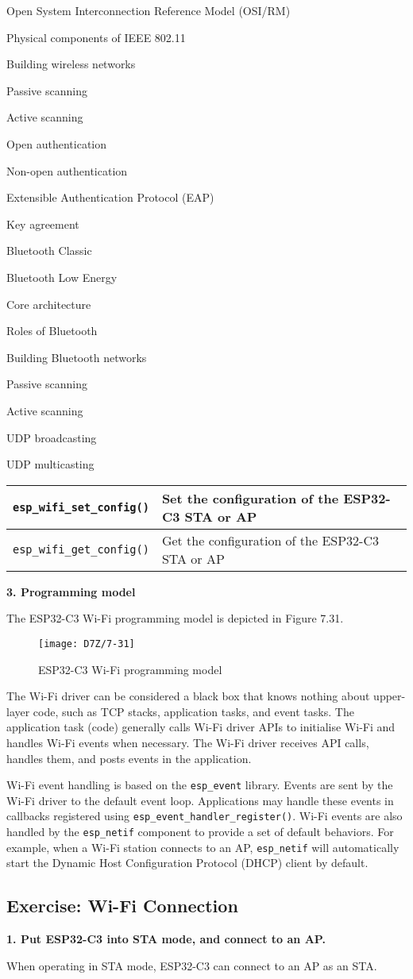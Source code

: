 \documentclass[a4paper,12pt]{book}
\begin{document}
\begin{term}{Open System Interconnection Reference Model (OSI/RM)}
\begin{term}{Physical components of IEEE 802.11}
\begin{term}{Building wireless networks}
\begin{term}{Passive scanning}
\begin{term}{Active scanning}
\begin{term}{Open authentication}
\begin{term}{Non-open authentication}
\begin{term}{Extensible Authentication Protocol (EAP)}
\begin{term}{Key agreement}
\begin{term}{Bluetooth Classic}
\begin{term}{Bluetooth Low Energy}
\begin{term}{Core architecture}
\begin{term}{Roles of Bluetooth}
\begin{term}{Building Bluetooth networks}
\begin{term}{Passive scanning}
\begin{term}{Active scanning}
\begin{term}{UDP broadcasting}
\begin{term}{UDP multicasting}
{\begin{longtable}{|>{\small}m{}|>{\small}m{}|}
    \verb|esp_wifi_set_config()|&Set the configuration of the ESP32-C3 STA or AP\\
    \hline
    \verb|esp_wifi_get_config()|&Get the configuration of the ESP32-C3 STA or AP\\
    \hline
\end{longtable}
}

\textbf{3. Programming model}

The ESP32-C3 Wi-Fi programming model is depicted in Figure 7.31.

\begin{figure}[!h]
    \centering
    \texttt{[image: D7Z/7-31]}
    \caption{ESP32-C3 Wi-Fi programming model}
\end{figure}

The Wi-Fi driver can be considered a black box that knows nothing about upper-layer code, such as TCP stacks, application tasks, and event tasks. The application task (code) generally calls Wi-Fi driver APIs to initialise Wi-Fi and handles Wi-Fi events when necessary. The Wi-Fi driver receives API calls, handles them, and posts events in the application.

Wi-Fi event handling is based on the \verb|esp_event| library. Events are sent by the Wi-Fi driver to the default event loop. Applications may handle these events in callbacks registered using \verb|esp_event_handler_register()|. Wi-Fi events are also handled by the \verb|esp_netif| component to provide a set of default behaviors. For example, when a Wi-Fi station connects to an AP, \verb|esp_netif| will automatically start the Dynamic Host Configuration Protocol (DHCP) client by default.

\subsection{Exercise: Wi-Fi Connection}
\textbf{1. Put ESP32-C3 into STA mode, and connect to an AP.}

When operating in STA mode, ESP32-C3 can connect to an AP as an STA. 


\end{term}
\end{term}
\end{term}
\end{term}
\end{term}
\end{term}
\end{term}
\end{term}
\end{term}
\end{term}
\end{term}
\end{term}
\end{term}
\end{term}
\end{term}
\end{term}
\end{term}
\end{term}
\end{document}
